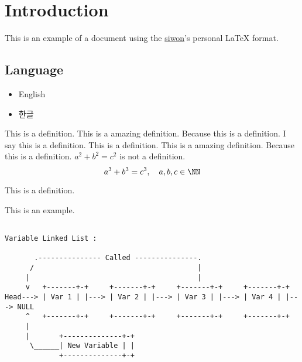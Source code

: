 \documentclass[../note.tex]{subfiles}
\begin{document}
\section{Introduction}
This is an example of a document using the \href{https://www.github.com/ysw421}{siwon}'s personal \LaTeX{} format.

\subsection{Language}
\begin{itemize}
	\item English
	\item 한글
\end{itemize}

\begin{definition}
  This is a definition.
  This is a amazing definition. Because this is a definition.
  I say this is a definition. This is a definition.
  This is a amazing definition. Because this is a definition.
  $a^2 + b^2 = c^2$ is not a definition.
  \begin{equation}
    a^3 + b^3 = c^3, \quad a,b,c \in \NN
  \end{equation}
\end{definition}
\begin{definition}
  This is a definition.
\end{definition}
\begin{example}[하위!]
  This is an example.
\begin{center}
  \small
  \begin{spacing}{0.8}
    \begin{BVerbatim}

Variable Linked List :

       .--------------- Called ---------------.
      /                                       |
     |                                        |
     v   +-------+-+     +-------+-+     +-------+-+     +-------+-+
Head---> | Var 1 | |---> | Var 2 | |---> | Var 3 | |---> | Var 4 | |---> NULL
     ^   +-------+-+     +-------+-+     +-------+-+     +-------+-+
     |
     |       +--------------+-+
      \______| New Variable | |
             +--------------+-+

    \end{BVerbatim}
  \end{spacing}
\end{center}
\end{example}
\end{document}
